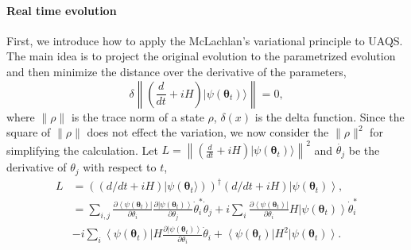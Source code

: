 \documentclass[twocolumn,
pra,aps,superscriptaddress,showpacs,amsmath,amssymb]{revtex4-2}
\begin{document}
\paragraph{\bf{Real time evolution}}
First, we introduce how to apply the McLachlan’s variational principle to UAQS. The main idea is to project the original evolution to the parametrized evolution and then minimize the distance over the derivative of the parameters,
\begin{equation}\label{eq:mprinciple_real}
\delta\left\|\left( \frac{d}{dt}+iH \right)|\psi(\bm{\theta}_t)\rangle\right\| = 0,
\end{equation} 
where $\|\rho\|$ is the trace norm of a state $\rho$, $\delta(x)$ is the delta function. Since the square of $\|\rho\|$ does not effect the variation, we now consider the $\|\rho\|^2$ for simplifying the calculation.
Let $L = \left\|\left( \frac{d}{dt}+iH \right)|\psi(\bm{\theta}_t)\rangle\right\|^2$ and $\dot{\theta_j}$ be the derivative of $\theta_j$ with respect to $t$, 
\begin{align}
L &=\left(\left(d/dt+iH\right)|\psi(\bm{\theta}_t\rangle)\right)^{\dagger}(d/dt+iH)\left|\psi(\bm{\theta}_t)\right\rangle,   \\
&=\sum_{i,j}\frac{\partial\left<\psi(\bm{\theta}_t)\right|}{\partial\theta_i}\frac{\partial\left|\psi(\bm{\theta}_t)\right>}{\partial\theta_j}\dot{\theta}_i^*\dot{\theta}_j+i\sum_i\frac{\partial\left<\psi(\bm{\theta}_t)\right|}{\partial\theta_i}H\left|\psi(\bm{\theta}_t)\right>\dot{\theta}_i^* \\
&-i\sum_i\left<\psi(\bm{\theta}_t)\right|H\frac{\partial\left|\psi(\bm{\theta}_t)\right>}{\partial\theta_i}\dot{\theta}_i+\left<\psi(\bm{\theta}_t)\right|H^2\left|\psi(\bm{\theta}_t)\right>.
\end{align}
\end{document}
